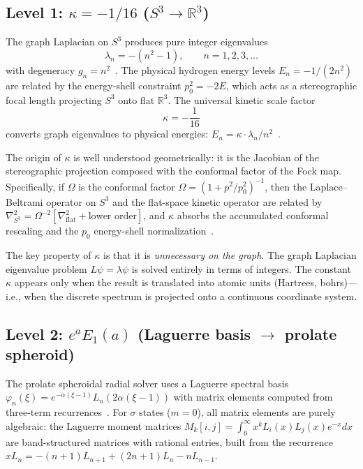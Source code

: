 \documentclass[aps,pra,twocolumn,superscriptaddress,longbibliography]{revtex4-2}
\begin{document}
\subsection{Level 1: $\kappa = -1/16$ ($S^3 \to \mathbb{R}^3$)}
\label{sec:kappa}

The graph Laplacian on $S^3$ produces pure integer eigenvalues
\begin{equation}
  \lambda_n = -(n^2 - 1), \qquad n = 1, 2, 3, \ldots
  \label{eq:s3_eigenvalues}
\end{equation}
with degeneracy $g_n = n^2$~\cite{loutey_paper7}.  The physical
hydrogen energy levels $E_n = -1/(2n^2)$ are related by the
energy-shell constraint $p_0^2 = -2E$, which acts as a
stereographic focal length projecting $S^3$ onto flat
$\mathbb{R}^3$.  The universal kinetic scale factor
\begin{equation}
  \kappa = -\frac{1}{16}
  \label{eq:kappa}
\end{equation}
converts graph eigenvalues to physical energies:
$E_n = \kappa \cdot \lambda_n / n^2$~\cite{loutey_paper0}.

The origin of $\kappa$ is well understood geometrically: it is
the Jacobian of the stereographic projection composed with the
conformal factor of the Fock map.  Specifically, if $\Omega$
is the conformal factor $\Omega = (1 + p^2/p_0^2)^{-1}$, then
the Laplace--Beltrami operator on $S^3$ and the flat-space
kinetic operator are related by
$\nabla^2_{S^3} = \Omega^{-2}[\nabla^2_{\mathrm{flat}} + \text{lower order}]$,
and $\kappa$ absorbs the accumulated conformal rescaling and
the $p_0$ energy-shell normalization~\cite{loutey_paper7}.

The key property of $\kappa$ is that it is \textit{unnecessary
on the graph}.  The graph Laplacian eigenvalue problem $L\psi =
\lambda\psi$ is solved entirely in terms of integers.  The
constant $\kappa$ appears only when the result is translated
into atomic units (Hartrees, bohrs)---i.e., when the discrete
spectrum is projected onto a continuous coordinate system.

\subsection{Level 2: $e^a E_1(a)$ (Laguerre basis $\to$ prolate spheroid)}
\label{sec:stieltjes}

The prolate spheroidal radial solver uses a Laguerre spectral
basis $\varphi_n(\xi) = e^{-\alpha(\xi-1)} L_n(2\alpha(\xi-1))$
with matrix elements computed from three-term
recurrences~\cite{loutey_paper11}.  For $\sigma$ states ($m = 0$),
all matrix elements are purely algebraic: the Laguerre moment
matrices $M_k[i,j] = \int_0^\infty x^k L_i(x) L_j(x) e^{-x}
dx$ are band-structured matrices with rational entries, built
from the recurrence $x L_n = -(n+1)L_{n+1} + (2n+1)L_n -
nL_{n-1}$.
\end{document}
